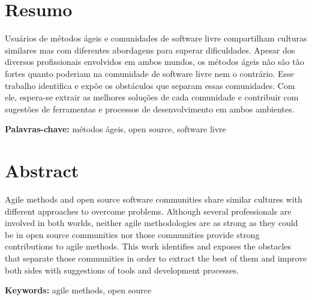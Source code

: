 \documentclass[12pt,twoside,letterpaper]{book}
\begin{document}




\chapter*{Resumo}

Usuários de métodos ágeis e comunidades de software livre compartilham
culturas similares mas com diferentes abordagens para superar
dificuldades. Apesar dos diversos profissionais envolvidos em ambos
mundos, os métodos ágeis não são tão fortes quanto poderiam na
comunidade de software livre nem o contrário. Esse trabalho identifica
e expõe os obstáculos que separam essas comunidades. Com ele,
espera-se extrair as melhores soluções de cada comunidade e contribuir
com sugestões de ferramentas e processos de desenvolvimento em ambos
ambientes.

\noindent \textbf{Palavras-chave:} métodos ágeis, open source,
software livre

\chapter*{Abstract}

Agile methods and open source software communities share similar
cultures with different approaches to overcome problems. Although
several professionals are involved in both worlds, neither agile
methodologies are as strong as they could be in open source
communities nor those communities provide strong contributions to
agile methods. This work identifies and exposes the obstacles that
separate those communities in order to extract the best of them and
improve both sides with suggestions of tools and development
processes.

\noindent \textbf{Keywords:} agile methods, open source
\end{document}
